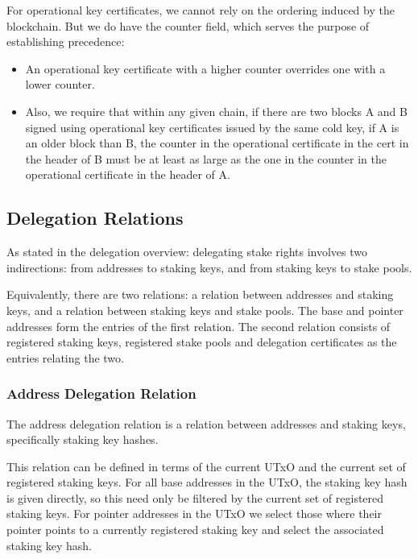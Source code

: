 \documentclass[11pt,a4paper]{article}
\begin{document}
For operational key certificates, we cannot rely on the ordering induced by
the blockchain. But we do have the counter field, which serves the
purpose of establishing precedence:

\begin{itemize}
\item
  An operational key certificate with a higher counter overrides one with a
  lower counter.
\item
  Also, we require that within any given chain, if there are two blocks A and B
  signed using operational key certificates issued by the same cold key, if A is
  an older block than B, the counter in the operational certificate in the cert
  in the header of B must be at least as large as the one in the counter in the
  operational certificate in the header of A.
\end{itemize}

\subsection{Delegation Relations}
\label{delegation-relations}

As stated in the delegation overview: delegating stake rights involves
two indirections: from addresses to staking keys, and from staking keys to
stake pools.

Equivalently, there are two relations: a relation between addresses and
staking keys, and a relation between staking keys and stake pools. The base
and pointer addresses form the entries of the first relation. The second
relation consists of registered staking keys, registered stake pools and
delegation certificates as the entries relating the two.

\subsubsection{Address Delegation Relation}
\label{address-delegation-relation}

The address delegation relation is a relation between addresses and
staking keys, specifically staking key hashes.

This relation can be defined in terms of the current UTxO and the
current set of registered staking keys. For all base addresses in the
UTxO, the staking key hash is given directly, so this need only be
filtered by the current set of registered staking keys. For pointer
addresses in the UTxO we select those where their pointer points to a
currently registered staking key and select the associated staking key hash.
\end{document}
